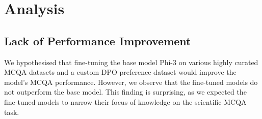 \section{Analysis}
\label{sec:analysis}




\subsection{Lack of Performance Improvement}
\label{subsec:lack-of-performance-improvement}

We hypothesised that fine-tuning the base model Phi-3 on various highly curated MCQA datasets and a custom DPO preference dataset would improve the model's MCQA performance. However, we observe that the fine-tuned models do not outperform the base model. This finding is surprising, as we expected the fine-tuned models to narrow their focus of knowledge on the scientific MCQA task.

